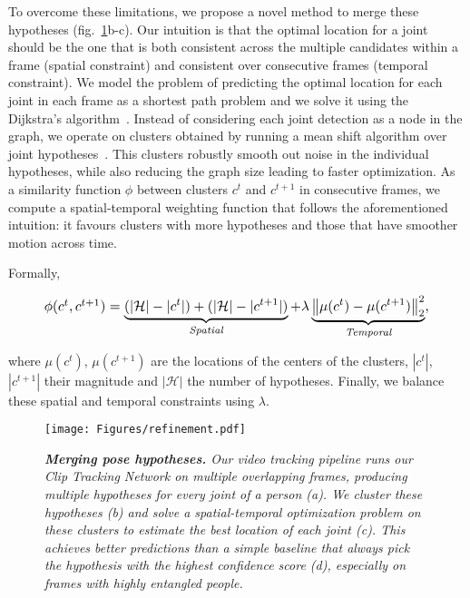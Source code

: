 \documentclass[10pt,twocolumn,letterpaper]{article}
\begin{document}
To overcome these limitations, we propose a novel method to merge these hypotheses (fig.~\ref{fig:refinement}{\color{red}b-c}). Our intuition is that the optimal location for a joint should be the one that is both consistent across the multiple candidates within a frame (spatial constraint) and consistent over consecutive frames (temporal constraint). 
We model the problem of predicting the optimal location for each joint in each frame as a shortest path problem and we solve it using the Dijkstra's algorithm~\cite{dijkstra1959note}. Instead of considering each joint detection as a node in the graph, we operate on clusters obtained by running a mean shift algorithm over joint hypotheses~\cite{comaniciu2002mean}. 
This clusters robustly smooth out noise in the individual hypotheses, while also reducing the graph size leading to faster optimization.
As a similarity function $\phi$ between clusters $c^t$ and $c^{t+1}$ in consecutive frames, we compute a spatial-temporal weighting function that follows the aforementioned intuition: it favours clusters with more hypotheses  and those that have smoother motion across time. 

Formally,

\vspace{-4mm}
\begin{equation}
\vspace{-4mm}
\resizebox{0.9\columnwidth}{!}{
	$\phi(c^t, c^{t+1}) = \underbrace{(|\mathcal{H}| - |c^t|) + (|\mathcal{H}| - |c^{t+1}|)}_\textit{Spatial} + \lambda\underbrace{\left\lVert \mu(c^{t}) - \mu(c^{t+1}) \right\rVert _2^2}_\textit{Temporal},$
	\vspace{-3mm}
}\end{equation}

\noindent where $\mu(c^t)$, $\mu(c^{t+1})$ are the locations of the centers of the clusters, $|c^t|$, $|c^{t+1}|$ their magnitude and $|\mathcal{H}|$ the number of hypotheses. Finally, we balance these spatial and temporal constraints using $\lambda$. 
 
 \begin{figure}
 	\begin{center}
    	\texttt{[image: Figures/refinement.pdf]}
	\end{center}
	\vspace{-7mm}
    	\caption{\small \it {\bf Merging pose hypotheses.} Our video tracking pipeline runs our Clip Tracking Network on multiple overlapping frames, producing multiple hypotheses for every joint of a person (a). We cluster these hypotheses (b) and solve a spatial-temporal optimization problem on these clusters to estimate the best location of each joint (c). This achieves better predictions than a simple baseline that always pick the hypothesis with the highest confidence score (d), especially on frames with highly entangled people.\vspace{-4mm}}
    \label{fig:refinement}
\end{figure}
\end{document}
